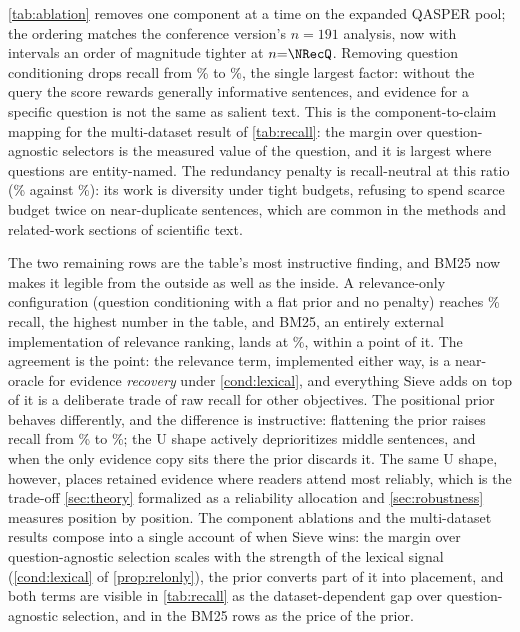 \documentclass[review,12pt]{elsarticle}
\theoremstyle{remark}
\newcommand{\method}{Sieve}
\begin{document}
\autoref{tab:ablation} removes one component at a time on the expanded
QASPER pool; the ordering matches the conference version's $n=191$
analysis, now with intervals an order of magnitude tighter at
$n{=}\NRecQ$. Removing question conditioning drops recall from
\AblSie\% to \AblNoQ\%, the single largest factor: without the query
the score rewards generally informative sentences, and evidence for a
specific question is not the same as salient text. This is the
component-to-claim mapping for the multi-dataset result of
\autoref{tab:recall}: the margin over question-agnostic selectors is
the measured value of the question, and it is largest where questions
are entity-named. The redundancy penalty is recall-neutral at this
ratio (\AblNoRed\% against \AblSie\%): its work is diversity under
tight budgets, refusing to spend scarce budget twice on near-duplicate
sentences, which are common in the methods and related-work sections
of scientific text.

The two remaining rows are the table's most instructive finding, and
BM25 now makes it legible from the outside as well as the inside. A
relevance-only configuration (question conditioning with a flat prior
and no penalty) reaches \AblRelOnly\% recall, the highest number in
the table, and BM25, an entirely external implementation of
relevance ranking, lands at \RecQBm\%, within a point of it. The
agreement is the point: the relevance term, implemented either way,
is a near-oracle for evidence \emph{recovery} under
\autoref{cond:lexical}, and everything \method{} adds on top of it is
a deliberate trade of raw recall for other objectives. The positional
prior behaves differently, and the difference is instructive:
flattening the prior raises recall from \AblSie\% to \AblNoPos\%; the
U shape actively deprioritizes middle sentences, and when the only
evidence copy sits there the prior discards it. The same U shape,
however, places retained evidence where readers attend most reliably,
which is the trade-off \autoref{sec:theory} formalized as a
reliability allocation and \autoref{sec:robustness} measures position
by position. The component ablations and the multi-dataset results
compose into a single account of when \method{} wins: the margin over
question-agnostic selection scales with the strength of the lexical
signal (\autoref{cond:lexical} of \autoref{prop:relonly}), the prior
converts part of it into placement, and both terms are visible in
\autoref{tab:recall} as the dataset-dependent gap over
question-agnostic selection, and in the BM25 rows as the price of
the prior.
\end{document}
